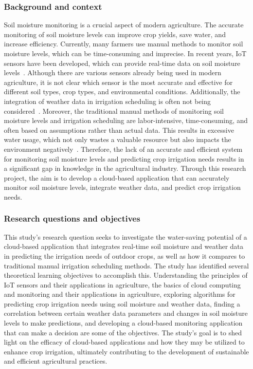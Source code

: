 \documentclass[11pt]{scrartcl} %
\begin{document}
\subsubsection{Background and context}
Soil moisture monitoring is a crucial aspect of modern agriculture. The accurate monitoring of soil moisture levels can improve crop yields, save water, and increase efficiency. Currently, many farmers use manual methods to monitor soil moisture levels, which can be time-consuming and imprecise. In recent years, IoT sensors have been developed, which can provide real-time data on soil moisture levels~\parencite{bwambale2022smart}.
\newline Although there are various sensors already being used in modern agriculture, it is not clear which sensor is the most accurate and effective for different soil types, crop types, and environmental conditions. Additionally, the integration of weather data in irrigation scheduling is often not being considered~\parencite{nandurkar2014design}.
\newline Moreover, the traditional manual methods of monitoring soil moisture levels and irrigation scheduling are labor-intensive, time-consuming, and often based on assumptions rather than actual data. This results in excessive water usage, which not only wastes a valuable resource but also impacts the environment negatively~\parencite{bwambale2022smart}.
\newline Therefore, the lack of an accurate and efficient system for monitoring soil moisture levels and predicting crop irrigation needs results in a significant gap in knowledge in the agricultural industry. Through this research project, the aim is to develop a cloud-based application that can accurately monitor soil moisture levels, integrate weather data, and predict crop irrigation needs.

\subsubsection{Research questions and objectives}
This study's research question seeks to investigate the water-saving potential of a cloud-based application that integrates real-time soil moisture and weather data in predicting the irrigation needs of outdoor crops, as well as how it compares to traditional manual irrigation scheduling methods. The study has identified several theoretical learning objectives to accomplish this.
\newline Understanding the principles of IoT sensors and their applications in agriculture, the basics of cloud computing and monitoring and their applications in agriculture, exploring algorithms for predicting crop irrigation needs using soil moisture and weather data, finding a correlation between certain weather data parameters and changes in soil moisture levels to make predictions, and developing a cloud-based monitoring application that can make a decision are some of the objectives. The study's goal is to shed light on the efficacy of cloud-based applications and how they may be utilized to enhance crop irrigation, ultimately contributing to the development of sustainable and efficient agricultural practices.
\end{document}
